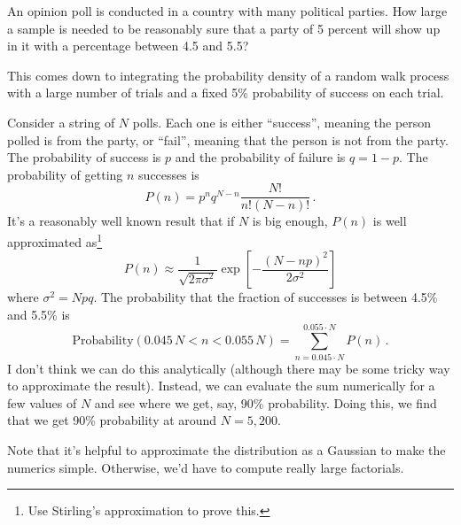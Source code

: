 

An opinion poll is conducted in a country with many political parties.
How large a sample is needed to be reasonably sure that a party of 5 percent will show up in it with a percentage between 4.5 and 5.5?


This comes down to integrating the probability density of a random walk process with a large number of trials and a fixed 5\% probability of success on each trial.

Consider a string of $N$ polls.
Each one is either ``success'', meaning the person polled is from the party, or ``fail'', meaning that the person is not from the party.
The probability of success is $p$ and the probability of failure is $q = 1 - p$.
The probability of getting $n$ successes is
\begin{equation*}
P(n) = p^n q^{N-n} \frac{N!}{n! (N-n)!} \, .
\end{equation*}
It's a reasonably well known result that if $N$ is big enough, $P(n)$ is well approximated as\footnote{Use Stirling's approximation to prove this.}
\begin{equation*}
P(n) \approx \frac{1}{\sqrt{2\pi \sigma^2}} \exp \left[ - \frac{(N - np)^2}{2 \sigma^2}\right]
\end{equation*}
where $\sigma^2 = Npq$.
The probability that the fraction of successes is between 4.5\% and 5.5\% is
\begin{equation*}
\text{Probability}(0.045\,N < n < 0.055\,N) = \sum_{n=0.045 \cdot N}^{0.055 \cdot N} P(n) \, .
\end{equation*}
I don't think we can do this analytically (although there may be some tricky way to approximate the result).
Instead, we can evaluate the sum numerically for a few values of $N$ and see where we get, say, 90\% probability.
Doing this, we find that we get 90\% probability at around $N=5,200$.

Note that it's helpful to approximate the distribution as a Gaussian to make the numerics simple.
Otherwise, we'd have to compute really large factorials.
